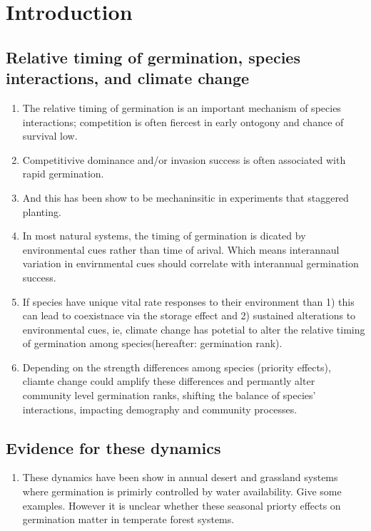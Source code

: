 \documentclass{article}\usepackage[]{graphicx}\usepackage[]{color}
\begin{document}
\section{Introduction}
\subsection{Relative timing of germination, species interactions, and climate change}
\begin{enumerate}
\item The relative timing of germination is an important mechanism of species interactions; competition is often fiercest in early ontogony and chance of survival low.
\item Competitivive dominance and/or invasion success is often associated with rapid germination.
\item And this has been show to be mechaninsitic in experiments that staggered planting.
\item In most natural systems, the timing of germination is dicated by environmental cues rather than time of arival. Which means interannaul variation in envirnmental cues should correlate with interannual germination success.
\item If species have unique vital rate responses to their environment than 1) this can lead to coexistnace via the storage effect and 2) sustained alterations to environmental cues, ie, climate change has potetial to alter the relative timing of germination among species(hereafter: germination rank). 
\item Depending on the strength differences among species (priority effects), cliamte change could amplify these differences and permantly alter community level germination ranks, shifting the balance of species' interactions, impacting demography and community processes.
\end{enumerate}
\subsection{Evidence for these dynamics}
\begin{enumerate}
\item These dynamics have been show in annual desert and grassland systems where germination is primirly controlled by water availability. Give some examples.
However it is unclear whether these seasonal priorty effects on germination matter in temperate forest systems.
\end{enumerate}
\end{document}
